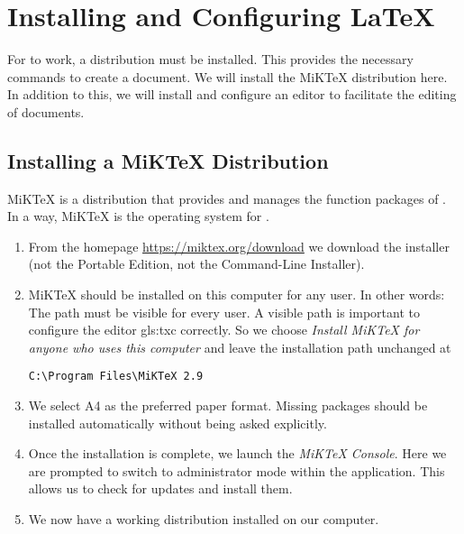 
\chapter{Installing and Configuring {\LaTeX}}
\label{cha:installation}
For \Latex to work, a distribution must be installed. This provides the necessary commands to create a document. We will install the MiKTeX distribution here. In addition to this, we will install and configure an editor to facilitate the editing of \Latex documents.



\section{Installing a MiKTeX Distribution}
\label{sec:miktex}
MiKTeX is a \Latex distribution that provides and manages the function packages of \Latex. In a way, MiKTeX is the operating system for \Latex.
\begin{enumerate}
	\item From the homepage \url{https://miktex.org/download} we download the installer (not the Portable Edition, not the Command-Line Installer).
	\item MiKTeX should be installed on this computer for any user. In other words: The path must be visible for every user. A visible path is important to configure the editor \gls{gls:txc} correctly. So we choose \textit{Install MiKTeX for anyone who uses this computer} and leave the installation path unchanged at 
	\begin{lstlisting}[caption=Installation path of the MiKTeX distribution]
		C:\Program Files\MiKTeX 2.9
	\end{lstlisting}
	\item We select A4 as the preferred paper format. Missing packages should be installed automatically without being asked explicitly.
	\item Once the installation is complete, we launch the \textit{MiKTeX Console}. Here we are prompted to switch to administrator mode within the application. This allows us to check for updates and install them. 
	\item We now have a working \Latex distribution installed on our computer.
\end{enumerate}

